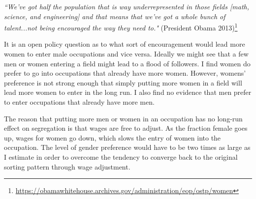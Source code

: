 \documentclass[12pt]{article}
\begin{document}
\textit{``We've got half the population that is way underrepresented in those fields [math, science, and engineering] and that means that we've got a whole bunch of talent...not being encouraged the way they need to."} (President Obama 2013)\footnote{\url{https://obamawhitehouse.archives.gov/administration/eop/ostp/women}}






It is an open policy question as to what sort of encouragement would lead more women to enter male occupations and vice versa. Ideally we might see that a few men or women entering a field might lead to a flood of followers. I find women do prefer to go into occupations that already have more women. However, womens' preference is not strong enough that simply putting more women in a field will lead more women to enter in the long run. I also find no evidence that men prefer to enter occupations that already have more men. 



The reason that putting more men or women in an occupation has no long-run effect on segregation is that wages are free to adjust. As the fraction female goes up, wages for women go down, which slows the entry of women into the occupation. The level of gender preference would have to be two times as large as I estimate in order to overcome the tendency to converge back to the original sorting pattern through wage adjustment.
\end{document}

